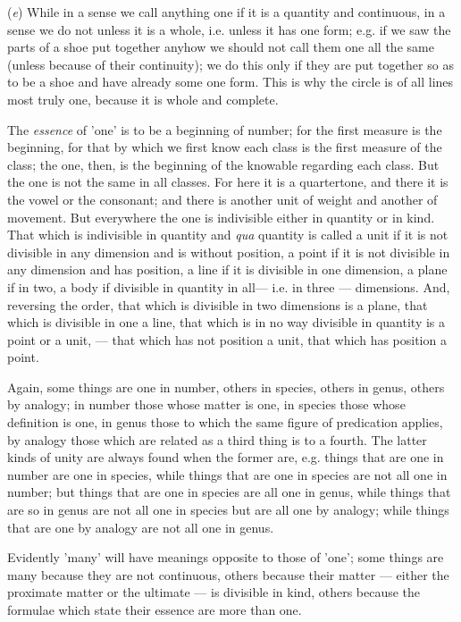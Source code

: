 (\emph{e}) While in a sense we call anything one if it is a quantity and continuous, in a sense we do not unless it is a whole, i.e. unless it has one form; e.g. if we saw the parts of a shoe put together anyhow we should not call them one all the same (unless because of their continuity); we do this only if they are put together so as to be a shoe and have already some one form. This is why the circle is of all lines most truly one, because it is whole and complete.

The \emph{essence} of 'one' is to be a beginning of number; for the first measure is the beginning, for that by which we first know each class is the first measure of the class; the one, then, is the beginning of the knowable regarding each class. But the one is not the same in all classes. For here it is a quartertone, and there it is the vowel or the consonant; and there is another unit of weight and another of movement. But everywhere the one is indivisible either in quantity or in kind. That which is indivisible in quantity and \emph{qua} quantity is called a unit if it is not divisible in any dimension and is without position, a point if it is not divisible in any dimension and has position, a line if it is divisible in one dimension, a plane if in two, a body if divisible in quantity in all— i.e. in three — dimensions. And, reversing the order, that which is divisible in two dimensions is a plane, that which is divisible in one a line, that which is in no way divisible in quantity is a point or a unit, — that which has not position a unit, that which has position a point.

Again, some things are one in number, others in species, others in genus, others by analogy; in number those whose matter is one, in species those whose definition is one, in genus those to which the same figure of predication applies, by analogy those which are related as a third thing is to a fourth. The latter kinds of unity are always found when the former are, e.g. things that are one in number are one in species, while things that are one in species are not all one in number; but things that are one in species are all one in genus, while things that are so in genus are not all one in species but are all one by analogy; while things that are one by analogy are not all one in genus.

Evidently 'many' will have meanings opposite to those of 'one'; some things are many because they are not continuous, others because their matter — either the proximate matter or the ultimate — is divisible in kind, others because the formulae which state their essence are more than one.

